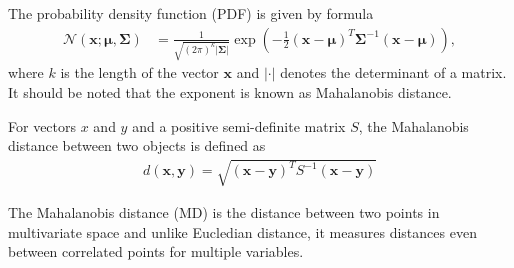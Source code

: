 The probability density function (PDF) is given by formula
\begin{align}
    \mathcal{N}(\mathbf{x};\mathbf{\mu},\mathbf{\Sigma}) &= \frac{1}{\sqrt{(2\pi)^k |\mathbf{\Sigma}|}}\exp \left(-\frac{1}{2}(\mathbf{x}-\mathbf{\mu})^T\mathbf{\Sigma}^{-1}(\mathbf{x}-\mathbf{\mu}) \right),
\end{align}
where $k$ is the length of the vector $\mathbf{x}$ and $|\cdot|$ denotes the determinant of a matrix. It should be noted that the exponent is known as Mahalanobis distance.
\begin{definition}
    For vectors $x$ and $y$ and a positive semi-definite matrix $S$, the Mahalanobis distance between two objects is defined as
    \begin{align}
        d(\mathbf{x},\mathbf{y}) = \sqrt{(\mathbf{x}-\mathbf{y})^T S^{-1} (\mathbf{x}-\mathbf{y})}
    \end{align}
\end{definition}
The Mahalanobis distance (MD) is the distance between two points in multivariate space and unlike Eucledian distance, it measures distances even between correlated points for multiple variables.

